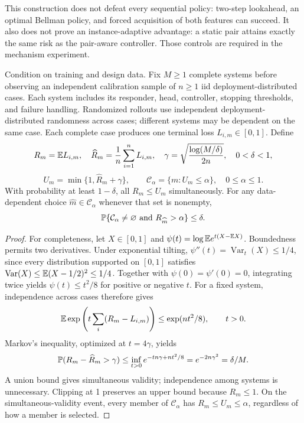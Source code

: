 This construction does not defeat every sequential policy: two-step
lookahead, an optimal Bellman policy, and forced acquisition of both
features can succeed. It also does not prove an instance-adaptive
advantage: a static pair attains exactly the same risk as the pair-aware
controller. Those controls are required in the mechanism experiment.

\begin{acamprop}
\label{prop:acam-certification}
Condition on training and design data. Fix $M\geq1$ complete systems
before observing an independent calibration sample of $n\geq1$ iid
deployment-distributed cases. Each system includes its responder, head,
controller, stopping thresholds, and failure handling. Randomized
rollouts use independent deployment-distributed randomness across cases;
different systems may be dependent on the same case. Each complete case
produces one terminal loss $L_{i,m}\in[0,1]$. Define
\[
 R_m=\mathbb{E} L_{i,m},\quad
 \widehat R_m=\frac1n\sum_{i=1}^nL_{i,m},\quad
 \gamma=\sqrt{\frac{\log(M/\delta)}{2n}},\quad 0<\delta<1,
\]
\[
 U_m=\min\{1,\widehat R_m+\gamma\},\qquad
 \mathcal C_\alpha=\{m:U_m\leq\alpha\},\quad 0\leq\alpha\leq1.
\]
With probability at least $1-\delta$, all $R_m\leq U_m$ simultaneously.
For any data-dependent choice $\widehat m\in\mathcal C_\alpha$ whenever
that set is nonempty,
\[
 \mathbb{P}\{\mathcal C_\alpha\neq\varnothing
          \text{ and }R_{\widehat m}>\alpha\}\leq\delta.
\]
\end{acamprop}

\begin{proof}
For completeness, let $X\in[0,1]$ and
$\psi(t)=\log\mathbb{E} e^{t(X-\mathbb{E} X)}$. Boundedness permits two
derivatives. Under exponential tilting,
$\psi''(t)=\operatorname{Var}_t(X)\leq1/4$, since every distribution
supported on $[0,1]$ satisfies
$\operatorname{Var}(X)\leq\mathbb{E}(X-1/2)^2\leq1/4$.
Together with $\psi(0)=\psi'(0)=0$, integrating twice yields
$\psi(t)\leq t^2/8$ for positive or negative $t$.
For a fixed system, independence across cases therefore gives
\[
 \mathbb{E}\exp\left(t\sum_i(R_m-L_{i,m})\right)
 \leq\exp(nt^2/8),\qquad t>0.
\]
Markov's inequality, optimized at $t=4\gamma$, yields
\[
 \mathbb{P}(R_m-\widehat R_m>\gamma)
 \leq\inf_{t>0}e^{-tn\gamma+nt^2/8}
 =e^{-2n\gamma^2}=\delta/M.
\]
A union bound gives simultaneous validity; independence among systems
is unnecessary. Clipping at 1 preserves an upper bound because $R_m\leq1$.
On the simultaneous-validity event, every member of
$\mathcal C_\alpha$ has $R_m\leq U_m\leq\alpha$, regardless of how a
member is selected.
\end{proof}

